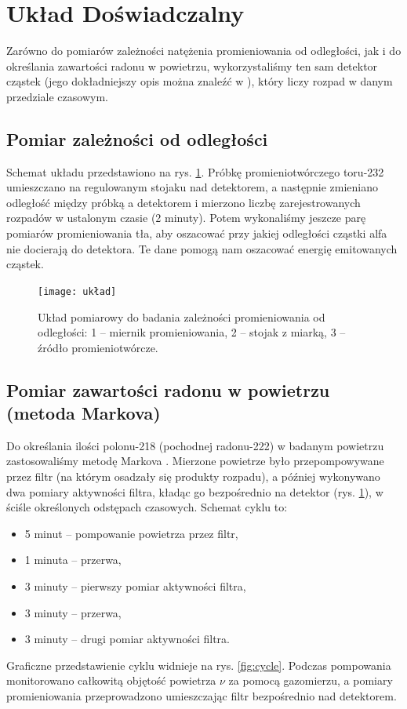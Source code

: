 \documentclass[12pt]{article}
\begin{document}
\section{Układ Doświadczalny}
Zarówno do pomiarów zależności natężenia promieniowania od odległości, jak i do określania zawartości radonu w powietrzu, wykorzystaliśmy ten sam detektor cząstek (jego dokładniejszy opis można znaleźć w \cite{skrypt}), który liczy rozpad w danym przedziale czasowym.

\subsection{Pomiar zależności od odległości}
Schemat układu przedstawiono na rys. \ref{fig:diagram}. Próbkę promieniotwórczego toru-232 umieszczano na regulowanym stojaku nad detektorem, a następnie zmieniano odległość między próbką a detektorem i mierzono liczbę zarejestrowanych rozpadów w ustalonym czasie (2 minuty).
Potem wykonaliśmy jeszcze parę pomiarów promieniowania tła, aby oszacować przy jakiej odległości cząstki alfa nie docierają do detektora. Te dane pomogą nam oszacować energię emitowanych cząstek.

\begin{figure}[H]
	\centering
	\texttt{[image: układ]}
	\caption{Układ pomiarowy do badania zależności promieniowania od odległości: 1 – miernik promieniowania, 2 – stojak z miarką, 3 – źródło promieniotwórcze.}
	\label{fig:diagram}
\end{figure}

\subsection{Pomiar zawartości radonu w powietrzu (metoda Markova)}
Do określania ilości polonu-218 (pochodnej radonu-222) w badanym powietrzu zastosowaliśmy metodę Markova \cite{equation}. Mierzone powietrze było przepompowywane przez filtr (na którym osadzały się produkty rozpadu), a później wykonywano dwa pomiary aktywności filtra, kładąc go bezpośrednio na detektor (rys. \ref{fig:diagram}), w ściśle określonych odstępach czasowych. Schemat cyklu to:
\begin{itemize}
	\item 5 minut – pompowanie powietrza przez filtr,
	\item 1 minuta – przerwa,
	\item 3 minuty – pierwszy pomiar aktywności filtra,
	\item 3 minuty – przerwa,
	\item 3 minuty – drugi pomiar aktywności filtra.
\end{itemize}
Graficzne przedstawienie cyklu widnieje na rys. \ref{fig:cycle}. Podczas pompowania monitorowano całkowitą objętość powietrza \(\nu\) za pomocą gazomierzu, a pomiary promieniowania przeprowadzono umieszczając filtr bezpośrednio nad detektorem.
\end{document}

